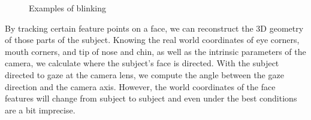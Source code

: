 \documentclass[11pt]{article}
\begin{document}
\begin{figure}%
    \centering
    \qquad
    \caption{Examples of blinking}%
    \label{gaze}%
\end{figure}

By tracking certain feature points on a face, we can reconstruct the 3D geometry of those parts of the subject. Knowing the real world coordinates of eye corners, mouth corners, and tip of nose and chin, as well as the intrinsic parameters of the camera, we calculate where the subject's face is directed. With the subject directed to gaze at the camera lens, we compute the angle between the gaze direction and the camera axis. However, the world coordinates of the face features will change from subject to subject and even under the best conditions are a bit imprecise.
\end{document}

